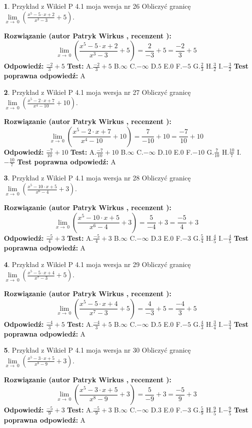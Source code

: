 \documentclass[12pt, a4paper]{article}
\theoremstyle{definition} %
\newtheorem{zad}{}
\newcommand{\zadStart}[1]{\begin{zad}#1\newline}
\newcommand{\zadStop}{\end{zad}}
\newcommand{\rozwStart}[2]{\noindent \textbf{Rozwiązanie (autor #1 , recenzent #2): }\newline}
\newcommand{\rozwStop}{\newline}
\newcommand{\odpStart}{\noindent \textbf{Odpowiedź:}\newline}
\newcommand{\odpStop}{\newline}
\newcommand{\testStart}{\noindent \textbf{Test:}\newline}
\newcommand{\testStop}{\newline}
\newcommand{\kluczStart}{\noindent \textbf{Test poprawna odpowiedź:}\newline}
\newcommand{\kluczStop}{\newline}
\begin{document}
\zadStart{Przykład z Wikieł P 4.1 moja wersja nr 26}
Obliczyć granicę $\lim\limits_{x\to\ 0}(\frac{x^{5}-5 \cdot x +2}{x^{3}-3}+5)$.
\zadStop
\rozwStart{Patryk Wirkus}{}
$$\lim\limits_{x\to\ 0}(\frac{x^{5}-5 \cdot x +2}{x^{3}-3}+5)=\frac{2}{-3}+5=\frac{-2}{3}+5$$
\rozwStop
\odpStart
$\frac{-2}{3}+5$
\odpStop
\testStart
A.$\frac{-2}{3}+5$
B.$\infty$
C.$-\infty$
D.$5$
E.$0$
F.$-5$
G.$\frac{2}{3}$
H.$\frac{3}{2}$
I.$-\frac{3}{2}$
\testStop
\kluczStart
A
\kluczStop



\zadStart{Przykład z Wikieł P 4.1 moja wersja nr 27}
Obliczyć granicę $\lim\limits_{x\to\ 0}(\frac{x^{5}-2 \cdot x +7}{x^{4}-10}+10)$.
\zadStop
\rozwStart{Patryk Wirkus}{}
$$\lim\limits_{x\to\ 0}(\frac{x^{5}-2 \cdot x +7}{x^{4}-10}+10)=\frac{7}{-10}+10=\frac{-7}{10}+10$$
\rozwStop
\odpStart
$\frac{-7}{10}+10$
\odpStop
\testStart
A.$\frac{-7}{10}+10$
B.$\infty$
C.$-\infty$
D.$10$
E.$0$
F.$-10$
G.$\frac{7}{10}$
H.$\frac{10}{7}$
I.$-\frac{10}{7}$
\testStop
\kluczStart
A
\kluczStop



\zadStart{Przykład z Wikieł P 4.1 moja wersja nr 28}
Obliczyć granicę $\lim\limits_{x\to\ 0}(\frac{x^{5}-10 \cdot x +5}{x^{6}-4}+3)$.
\zadStop
\rozwStart{Patryk Wirkus}{}
$$\lim\limits_{x\to\ 0}(\frac{x^{5}-10 \cdot x +5}{x^{6}-4}+3)=\frac{5}{-4}+3=\frac{-5}{4}+3$$
\rozwStop
\odpStart
$\frac{-5}{4}+3$
\odpStop
\testStart
A.$\frac{-5}{4}+3$
B.$\infty$
C.$-\infty$
D.$3$
E.$0$
F.$-3$
G.$\frac{5}{4}$
H.$\frac{4}{5}$
I.$-\frac{4}{5}$
\testStop
\kluczStart
A
\kluczStop



\zadStart{Przykład z Wikieł P 4.1 moja wersja nr 29}
Obliczyć granicę $\lim\limits_{x\to\ 0}(\frac{x^{5}-5 \cdot x +4}{x^{7}-3}+5)$.
\zadStop
\rozwStart{Patryk Wirkus}{}
$$\lim\limits_{x\to\ 0}(\frac{x^{5}-5 \cdot x +4}{x^{7}-3}+5)=\frac{4}{-3}+5=\frac{-4}{3}+5$$
\rozwStop
\odpStart
$\frac{-4}{3}+5$
\odpStop
\testStart
A.$\frac{-4}{3}+5$
B.$\infty$
C.$-\infty$
D.$5$
E.$0$
F.$-5$
G.$\frac{4}{3}$
H.$\frac{3}{4}$
I.$-\frac{3}{4}$
\testStop
\kluczStart
A
\kluczStop



\zadStart{Przykład z Wikieł P 4.1 moja wersja nr 30}
Obliczyć granicę $\lim\limits_{x\to\ 0}(\frac{x^{5}-3 \cdot x +5}{x^{8}-9}+3)$.
\zadStop
\rozwStart{Patryk Wirkus}{}
$$\lim\limits_{x\to\ 0}(\frac{x^{5}-3 \cdot x +5}{x^{8}-9}+3)=\frac{5}{-9}+3=\frac{-5}{9}+3$$
\rozwStop
\odpStart
$\frac{-5}{9}+3$
\odpStop
\testStart
A.$\frac{-5}{9}+3$
B.$\infty$
C.$-\infty$
D.$3$
E.$0$
F.$-3$
G.$\frac{5}{9}$
H.$\frac{9}{5}$
I.$-\frac{9}{5}$
\testStop
\kluczStart
A
\kluczStop
\end{document}
